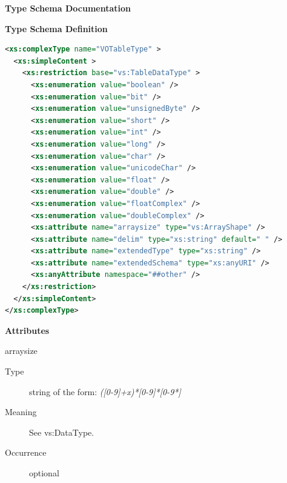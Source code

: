 \documentclass[11pt,a4paper]{ivoa}
\begin{document}
\begin{generated}
\begingroup
      	\renewcommand*\descriptionlabel[1]{%
      	\hbox to 5.5em{\emph{#1}\hfil}}\vspace{2ex}\noindent\textbf{ Type Schema Documentation}


\vspace{1ex}\noindent\textbf{ Type Schema Definition}

\begin{lstlisting}[language=XML,basicstyle=\footnotesize]
<xs:complexType name="VOTableType" >
  <xs:simpleContent >
    <xs:restriction base="vs:TableDataType" >
      <xs:enumeration value="boolean" />
      <xs:enumeration value="bit" />
      <xs:enumeration value="unsignedByte" />
      <xs:enumeration value="short" />
      <xs:enumeration value="int" />
      <xs:enumeration value="long" />
      <xs:enumeration value="char" />
      <xs:enumeration value="unicodeChar" />
      <xs:enumeration value="float" />
      <xs:enumeration value="double" />
      <xs:enumeration value="floatComplex" />
      <xs:enumeration value="doubleComplex" />
      <xs:attribute name="arraysize" type="vs:ArrayShape" />
      <xs:attribute name="delim" type="xs:string" default=" " />
      <xs:attribute name="extendedType" type="xs:string" />
      <xs:attribute name="extendedSchema" type="xs:anyURI" />
      <xs:anyAttribute namespace="##other" />
    </xs:restriction>
  </xs:simpleContent>
</xs:complexType>
\end{lstlisting}

\vspace{0.5ex}\noindent\textbf{ Attributes}

\begingroup\small\begin{bigdescription}
\item[arraysize]
\begin{description}
\item[Type] string of the form: \emph{([0-9]+x)*[0-9]*[0-9*]}
\item[Meaning] See vs:DataType.
\item[Occurrence] optional


\end{description}
\end{bigdescription}
\end{generated}
\end{document}
